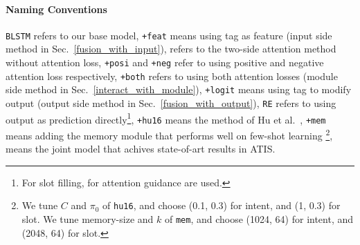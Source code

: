 \paragraph{Naming Conventions}
\texttt{BLSTM} refers to our base model,
\texttt{+feat} means using \RE tag as feature (input side method in Sec.~\ref{fusion_with_input}),
\ptatt refers to the two-side attention method without attention loss,
\texttt{+posi} and \texttt{+neg} refer to using positive and negative attention loss respectively, \texttt{+both} refers to using both attention losses (\NN module side method in Sec.~\ref{interact_with_module}),
\texttt{+logit} means using \RE tag to modify \NN output (output side method in Sec.~\ref{fusion_with_output}),
\texttt{RE} refers to using \RE output as prediction directly\footnote{
For slot filling, \REs for attention guidance are used.},
\texttt{+hu16} means the method of Hu et al.~,
\texttt{+mem} means adding the memory module that performs well on few-shot learning \cite{kaiser2017learning}\footnote{
We tune $C$ and $\pi_0$ of \texttt{hu16}, and choose (0.1, 0.3) for intent, and (1, 0.3) for slot. We tune memory-size and $k$ of \texttt{mem}, and choose (1024, 64) for intent, and (2048, 64) for slot.
},
\LL means the joint model \cite{liu2016attention} that achives state-of-art results in ATIS.
